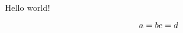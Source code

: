 \documentclass{minimal}
\begin{document}
  \begin{flushleft}
    Hello world!
  \end{flushleft}

        \begin{equation}
                  a = b \\
                  c = d
        \end{equation}
\end{document}

